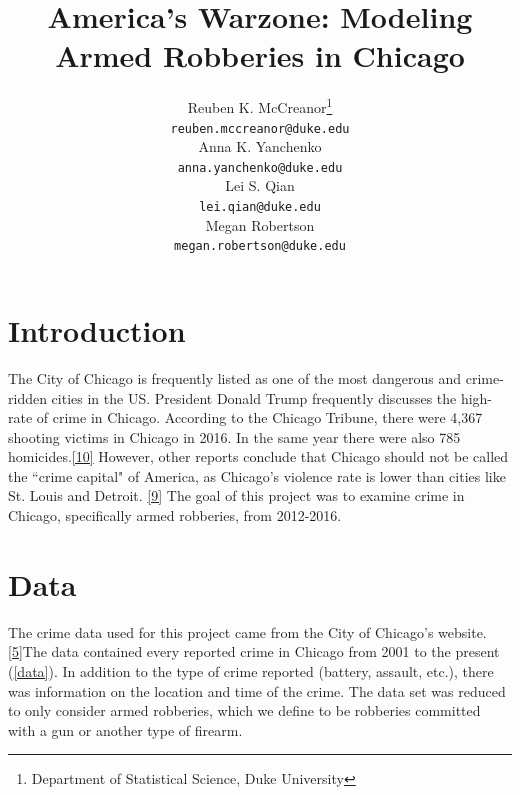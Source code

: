 \documentclass{article} %
\title{America's Warzone: Modeling Armed Robberies in Chicago}
\author{
Reuben K. McCreanor\thanks{Department of Statistical Science, Duke University} \\  
\texttt{reuben.mccreanor@duke.edu} \\
\And
Anna K. Yanchenko\footnotemark[1] \\
\texttt{anna.yanchenko@duke.edu} \\
\And 
Lei S. Qian\footnotemark[1] \\
\texttt{lei.qian@duke.edu} \\
\And
Megan Robertson\footnotemark[1] \\
\texttt{megan.robertson@duke.edu} \\ 
}
\begin{document}
\maketitle

\section{Introduction}
\label{headings}

\noindent The City of Chicago is frequently listed as one of the most dangerous and crime-ridden cities in the US. President Donald Trump frequently discusses the high-rate of crime in Chicago. According to the Chicago Tribune, there were 4,367 shooting victims in Chicago in 2016. In the same year there were also 785 homicides.\hyperlink{Ref10}{[10]} However, other reports conclude that Chicago should not be called the ``crime capital" of America, as Chicago's violence rate is lower than cities like St.  Louis and Detroit. \hyperlink{Ref9}{[9]} The goal of this project was to examine crime in Chicago, specifically armed robberies, from 2012-2016. \newline

\section{Data}
\label{headings}

\noindent The crime data used for this project came from the City of Chicago's website. \hyperlink{Ref5}{[5]}The data contained every reported crime in Chicago from 2001 to the present (\autoref{data}). In addition to the type of crime reported (battery, assault, etc.), there was information on the location and time of the crime. The data set was reduced to only consider armed robberies, which we define to be robberies committed with a gun or another type of firearm. 
\end{document}
